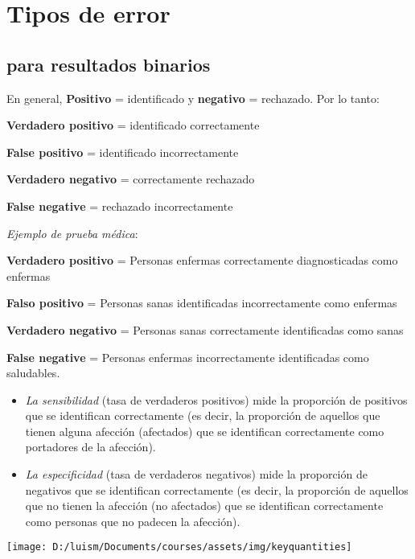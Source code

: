 \documentclass[
]{article}
\providecommand{\tightlist}{%
  \setlength{\itemsep}{0pt}\setlength{\parskip}{0pt}}
\begin{document}
\hypertarget{tipos-de-error}{%
\section{Tipos de error}\label{tipos-de-error}}

\hypertarget{para-resultados-binarios}{%
\subsection{para resultados binarios}\label{para-resultados-binarios}}

En general, \textbf{Positivo} = identificado y \textbf{negativo} =
rechazado. Por lo tanto:

\textbf{Verdadero positivo} = identificado correctamente

\textbf{False positivo} = identificado incorrectamente

\textbf{Verdadero negativo} = correctamente rechazado

\textbf{False negative} = rechazado incorrectamente

\emph{Ejemplo de prueba médica}:

\textbf{Verdadero positivo} = Personas enfermas correctamente
diagnosticadas como enfermas

\textbf{Falso positivo } = Personas sanas identificadas incorrectamente
como enfermas

\textbf{Verdadero negativo} = Personas sanas correctamente identificadas
como sanas

\textbf{False negative} = Personas enfermas incorrectamente
identificadas como saludables.

\begin{itemize}
\tightlist
\item
  \emph{La sensibilidad} (tasa de verdaderos positivos) mide la
  proporción de positivos que se identifican correctamente (es decir, la
  proporción de aquellos que tienen alguna afección (afectados) que se
  identifican correctamente como portadores de la afección).
\item
  \emph{La especificidad} (tasa de verdaderos negativos) mide la
  proporción de negativos que se identifican correctamente (es decir, la
  proporción de aquellos que no tienen la afección (no afectados) que se
  identifican correctamente como personas que no padecen la afección).
\end{itemize}

\begin{center}\texttt{[image: D:/luism/Documents/courses/assets/img/keyquantities]} \end{center}
\end{document}
